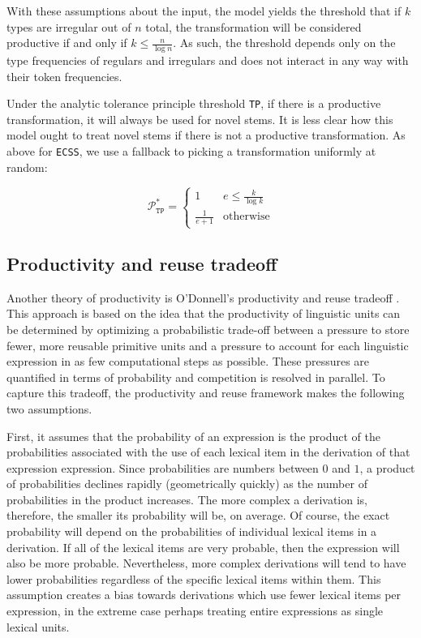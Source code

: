 \documentclass[
   11pt,
       ]{book}
\begin{document}
With these assumptions about the input, the model yields the threshold that if
\(k\) types are irregular out of \(n\) total, the transformation will be considered
productive if and only if \(k \leq \frac{n}{\log{n}}\). As such, the threshold
depends only on the type frequencies of regulars and irregulars and does not
interact in any way with their token frequencies.

Under the analytic tolerance principle threshold \texttt{TP}, if there is a productive
transformation, it will always be used for novel stems. It is less clear how
this model ought to treat novel stems if there is not a productive
transformation. As above for \texttt{ECSS}, we use a fallback to picking a
transformation uniformly at random:

\[
\mathcal{P}^*_{\texttt{TP}} =
  \begin{cases}
    1 & e \leq \frac{k}{\log{k}} \\
    \frac{1}{e+1} & \text{otherwise}
  \end{cases}
\]

\hypertarget{productivity-and-reuse-tradeoff}{%
\subsection{Productivity and reuse tradeoff}\label{productivity-and-reuse-tradeoff}}

Another theory of productivity is O'Donnell's productivity and reuse tradeoff
\citep{odonnell2011, odonnell2015, odonnell2009}. This approach is based on the
idea that the productivity of linguistic units can be determined by optimizing a
probabilistic trade-off between a pressure to store fewer, more reusable
primitive units and a pressure to account for each linguistic expression in as
few computational steps as possible. These pressures are quantified in terms of
probability and competition is resolved in parallel. To capture this tradeoff,
the productivity and reuse framework makes the following two assumptions.

First, it assumes that the probability of an expression is the product of the
probabilities associated with the use of each lexical item in the derivation of
that expression expression. Since probabilities are numbers between \(0\) and \(1\),
a product of probabilities declines rapidly (geometrically quickly) as the
number of probabilities in the product increases. The more complex a derivation
is, therefore, the smaller its probability will be, on average. Of course, the
exact probability will depend on the probabilities of individual lexical items
in a derivation. If all of the lexical items are very probable, then the
expression will also be more probable. Nevertheless, more complex derivations
will tend to have lower probabilities regardless of the specific lexical items
within them. This assumption creates a bias towards derivations which use fewer
lexical items per expression, in the extreme case perhaps treating entire
expressions as single lexical units.
\end{document}
